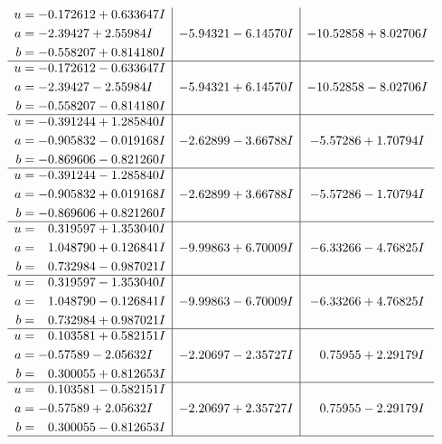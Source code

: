 \documentclass[1p]{elsarticle_modified}
\theoremstyle{definition}
\begin{document}
$$\begin{array}{c|c|c}
\begin{aligned}
u &= -0.172612 + 0.633647 I \\
a &= -2.39427 + 2.55984 I \\
b &= -0.558207 + 0.814180 I\end{aligned}
 & -5.94321 - 6.14570 I & -10.52858 + 8.02706 I \\ \hline\begin{aligned}
u &= -0.172612 - 0.633647 I \\
a &= -2.39427 - 2.55984 I \\
b &= -0.558207 - 0.814180 I\end{aligned}
 & -5.94321 + 6.14570 I & -10.52858 - 8.02706 I \\ \hline\begin{aligned}
u &= -0.391244 + 1.285840 I \\
a &= -0.905832 - 0.019168 I \\
b &= -0.869606 - 0.821260 I\end{aligned}
 & -2.62899 - 3.66788 I & -5.57286 + 1.70794 I \\ \hline\begin{aligned}
u &= -0.391244 - 1.285840 I \\
a &= -0.905832 + 0.019168 I \\
b &= -0.869606 + 0.821260 I\end{aligned}
 & -2.62899 + 3.66788 I & -5.57286 - 1.70794 I \\ \hline\begin{aligned}
u &= \phantom{-}0.319597 + 1.353040 I \\
a &= \phantom{-}1.048790 + 0.126841 I \\
b &= \phantom{-}0.732984 - 0.987021 I\end{aligned}
 & -9.99863 + 6.70009 I & -6.33266 - 4.76825 I \\ \hline\begin{aligned}
u &= \phantom{-}0.319597 - 1.353040 I \\
a &= \phantom{-}1.048790 - 0.126841 I \\
b &= \phantom{-}0.732984 + 0.987021 I\end{aligned}
 & -9.99863 - 6.70009 I & -6.33266 + 4.76825 I \\ \hline\begin{aligned}
u &= \phantom{-}0.103581 + 0.582151 I \\
a &= -0.57589 - 2.05632 I \\
b &= \phantom{-}0.300055 + 0.812653 I\end{aligned}
 & -2.20697 - 2.35727 I & \phantom{-}0.75955 + 2.29179 I \\ \hline\begin{aligned}
u &= \phantom{-}0.103581 - 0.582151 I \\
a &= -0.57589 + 2.05632 I \\
b &= \phantom{-}0.300055 - 0.812653 I\end{aligned}
 & -2.20697 + 2.35727 I & \phantom{-}0.75955 - 2.29179 I\\
 \hline 
 \end{array}$$\newpage
\end{document}
